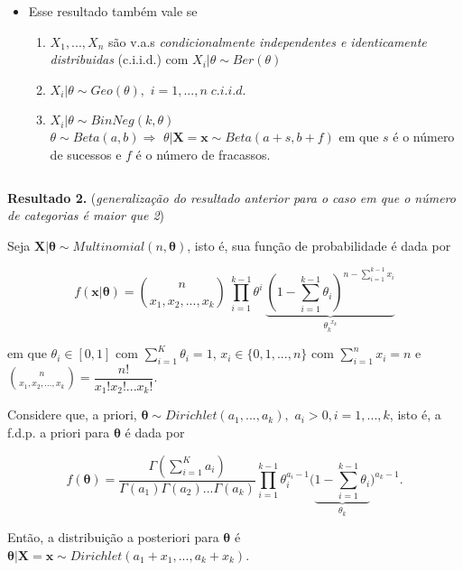 \documentclass[
]{book}
\providecommand{\tightlist}{%
  \setlength{\itemsep}{0pt}\setlength{\parskip}{0pt}}
\begin{document}
\(~\)

\begin{itemize}
\tightlist
\item
  Esse resultado também vale se

  \begin{enumerate}
  \def\labelenumi{\arabic{enumi}.}
  \tightlist
  \item
    \(X_1,...,X_n\) são v.a.s \emph{condicionalmente independentes e identicamente distribuidas} (c.i.i.d.) com \(X_i|\theta \sim Ber(\theta)\)\\
  \item
    \(X_i|\theta\sim Geo(\theta),\) \(i=1,...,n \; c.i.i.d.\)\\
  \item
    \(X_i|\theta \sim BinNeg(k,\theta)\)\\
    \(\theta\sim Beta(a,b)\Rightarrow\) \(\theta|\boldsymbol X=\boldsymbol x \sim Beta(a+s,b+f)\) em que \(s\) é o número de sucessos e \(f\) é o número de fracassos.
  \end{enumerate}
\end{itemize}

\(~\)

\textbf{Resultado 2.} (\emph{generalização do resultado anterior para o caso em que o número de categorias é maior que 2})

Seja \(\boldsymbol X | \boldsymbol \theta \sim Multinomial(n,\boldsymbol \theta)\), isto é, sua função de probabilidade é dada por

\[f(\boldsymbol x| \boldsymbol \theta)= \binom{n}{x_1,x_2,...,x_k}~\prod_{i=1}^{k-1}\theta^i~\underbrace{\left(1-\sum_{i=1}^{k-1}\theta_i\right)^{\displaystyle n-\sum_{i=1}^{k-1}x_i}}_{\displaystyle \theta_k^{~~x_k}}\]

em que \(\theta_i\in [0,1]\) com \(\sum_{i=1}^K\theta_i=1\), \(x_i \in \{0,1,...,n\}\) com \(\sum_{i=1}^nx_i=n\) e \(\displaystyle \binom{n}{x_1,x_2,...,x_k}=\dfrac{n!}{x_1!x_2!...x_k!}\).

Considere que, a priori, \(\boldsymbol \theta \sim Dirichlet(a_1,...,a_k),\) \(a_i > 0, i=1,...,k\), isto é, a f.d.p. a priori para \(\boldsymbol \theta\) é dada por

\[f(\boldsymbol \theta) = \dfrac{\Gamma(\sum_{i=1}^K a_i)}{\Gamma(a_1)\Gamma(a_2)...\Gamma(a_k)}\prod_{i=1}^{k-1}\theta_i^{a_i-1}\bigg(\underbrace{1-\sum_{i=1}^{k-1}\theta_i}_{\theta_k}\bigg)^{a_k-1}.\]

Então, a distribuição a posteriori para \(\boldsymbol \theta\) é
\(\boldsymbol \theta|\boldsymbol X = \boldsymbol x \sim Dirichlet (a_1+x_1,...,a_k+x_k)\).
\end{document}
